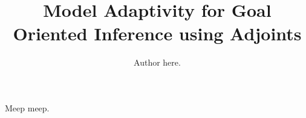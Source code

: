 \documentclass[review]{siamart0516}
\begin{document}
\raggedbottom %

\title{Model Adaptivity for Goal Oriented Inference using Adjoints}

\author{Author here.}
\maketitle

Meep meep.

\begin{abstract}

\end{abstract}









\end{document}
